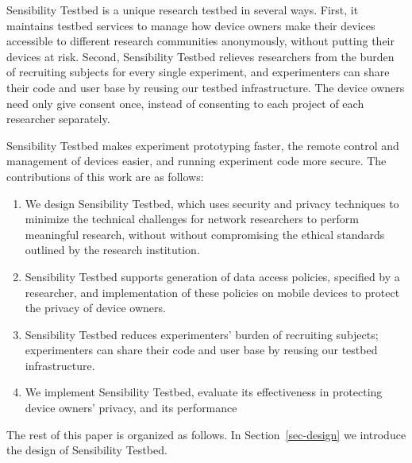 Sensibility Testbed is a unique research testbed in several ways.
First, %
it maintains testbed services to manage how device 
owners make their devices accessible to different research 
communities anonymously, without putting
their devices at risk. 
Second, Sensibility Testbed relieves researchers from the burden of
recruiting subjects for every single experiment, and 
experimenters can share their code and user base by reusing
our testbed infrastructure. The device
owners need only give consent once, instead of 
consenting to each project of each researcher separately.

Sensibility Testbed makes experiment
prototyping faster, the remote control and management of devices
easier, and running experiment code more secure. The
contributions of this work are as follows:

\begin{enumerate}
\item We design Sensibility Testbed, which uses security and 
privacy techniques to minimize the technical challenges for 
network researchers to perform meaningful research, without 
without compromising the ethical standards outlined by the 
research institution.

\item Sensibility Testbed supports generation of data access 
policies, specified by a researcher, and implementation of 
these policies on mobile devices to protect the privacy of 
device owners.

\item Sensibility Testbed reduces experimenters' burden of 
recruiting subjects; experimenters can share their code and 
user base by reusing our testbed infrastructure.


\item We implement Sensibility Testbed, evaluate its effectiveness
in protecting device owners' privacy, and its performance 
\end{enumerate}

The rest of this paper is organized as follows. In Section~\ref{sec-design}
we introduce the design of Sensibility Testbed.
